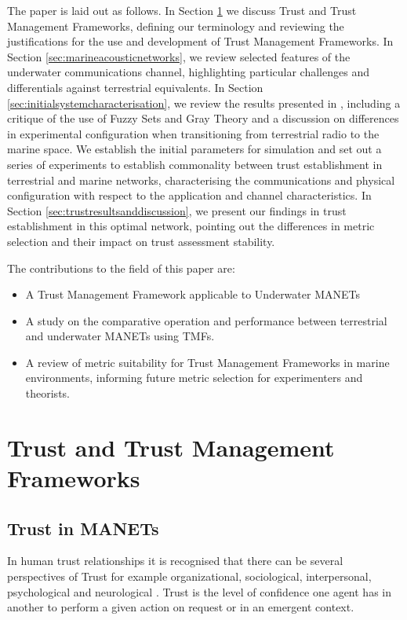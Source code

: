 \documentclass[runningheads,a4paper]{llncs}
\begin{document}
The paper is laid out as follows.
In Section \ref{sec:trustandtmfs} we discuss Trust and Trust Management Frameworks, defining our terminology and reviewing the justifications for the use and development of Trust Management Frameworks.
In Section \ref{sec:marineacousticnetworks}, we review selected features of the underwater communications channel, highlighting particular challenges and differentials against terrestrial equivalents.
In Section \ref{sec:initialsystemcharacterisation}, we review the results presented in \cite{Guo11}, including a critique of the use of Fuzzy Sets and Gray Theory and a discussion on differences in experimental configuration when transitioning from terrestrial radio to the marine space. 
We establish the initial parameters for simulation and set out a series of experiments to establish commonality between trust establishment in terrestrial and marine networks, characterising the communications and physical configuration with respect to the application and channel characteristics.
In Section \ref{sec:trustresultsanddiscussion}, we present our findings in trust establishment in this optimal network, pointing out the differences in metric selection and their impact on trust assessment stability.

The contributions to the field of this paper are:
\begin{itemize}
  \item A Trust Management Framework applicable to Underwater MANETs
  \item A study on the comparative operation and performance between terrestrial and underwater MANETs using TMFs.
  \item A review of metric suitability for Trust Management Frameworks in marine environments, informing future metric selection for experimenters and theorists.
\end{itemize}

\section{Trust and Trust Management Frameworks}\label{sec:trustandtmfs}

\subsection{Trust in MANETs}\label{sec:trustinmanets}

In human trust relationships it is recognised that there can be several perspectives of Trust for example organizational, sociological, interpersonal, psychological and neurological \cite{Lee2004}.
Trust is the level of confidence one agent has in another to perform a given action on request or in an emergent context.
\end{document}
